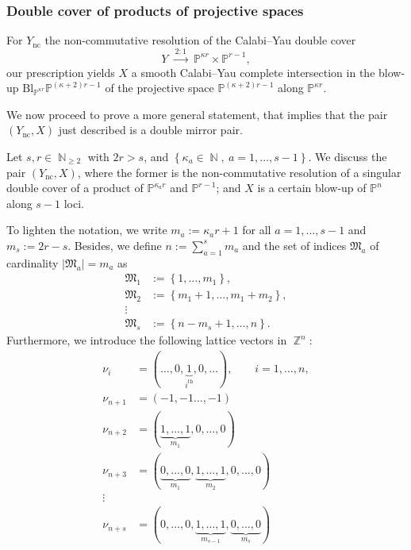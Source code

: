 \documentclass[12pt,a4paper,oneside]{amsart}
\numberwithin{equation}{section}
\theoremstyle{definition}
\theoremstyle{remark}
\DeclareMathOperator{\N}{\mathbb{N}}
\DeclareMathOperator{\Z}{\mathbb{Z}}
\newcommand{\cP}{\mathbb{P}}
\newcommand{\Ync}{Y_{\mathrm{nc}}}
\begin{document}
\subsubsection{Double cover of products of projective spaces}
For $\Ync$ the non-commutative resolution of the Calabi--Yau double cover 
\begin{equation*}
	Y \ \xrightarrow{ \ 2:1 \ } \ \cP^{\kappa r} \times \cP^{r-1} ,
\end{equation*}
our prescription yields $X$ a smooth Calabi--Yau complete intersection in the blow-up $\mathrm{Bl}_{\cP^{\kappa r}} \cP^{(\kappa +2)r-1}$ of the projective space $ \cP^{(\kappa +2)r -1}$ along $\cP^{\kappa r}$.\par
We now proceed to prove a more general statement, that implies that the pair $(\Ync, X)$ just described is a double mirror pair.\par
Let $s ,r \in \N_{\ge 2}$ with $2r >s$, and $\left\{ \kappa_a \in \N , \ a=1, \dots, s -1\right\}$. We discuss the pair $(\Ync, X)$, where the former is the non-commutative resolution of a singular double cover of a product of $\cP^{\kappa_a r}$ and $\cP^{r-1}$; and $X$ is a certain blow-up of $\cP^n$ along $s-1$ loci.\par
To lighten the notation, we write $m_a := \kappa_a r + 1$ for all $a=1, \dots, s-1$ and $m_s:=2r-s$. Besides, we define $n:= \sum_{a=1}^{s} m_a$ and the set of indices $\mathfrak{M}_a$ of cardinality $\lvert \mathfrak{M}_a \rvert =m_a$ as 
\begin{align*}
	\mathfrak{M}_1 &:= \left\{ 1, \dots, m_1 \right\} , \\
	\mathfrak{M}_2 &:= \left\{ m_1+1, \dots, m_1+m_2 \right\} , \\
	\vdots & \\
	\mathfrak{M}_s &:= \left\{ n-m_s+1, \dots, n \right\} .
\end{align*}
Furthermore, we introduce the following lattice vectors in $\Z^n$:
\begin{align*}
	\nu_i &= (\dots, 0,\underbrace{1}_{i^{\text{th}}} ,0, \dots ) , \qquad i=1, \dots, n , \\
	\nu_{n+1} &= (-1,-1 \dots, -1) \\
	\nu_{n+2} &= (\underbrace{1, \dots, 1}_{m_1}, 0, \dots , 0) \\
	\nu_{n+3} &= (\underbrace{0, \dots, 0}_{m_1},\underbrace{1, \dots, 1}_{m_2}, 0, \dots , 0) \\
	\vdots & \\
	\nu_{n+s} &= (0, \dots, 0,\underbrace{1, \dots, 1}_{m_{s-1}}, \underbrace{0, \dots , 0}_{m_s}) \\
\end{align*}
\end{document}
